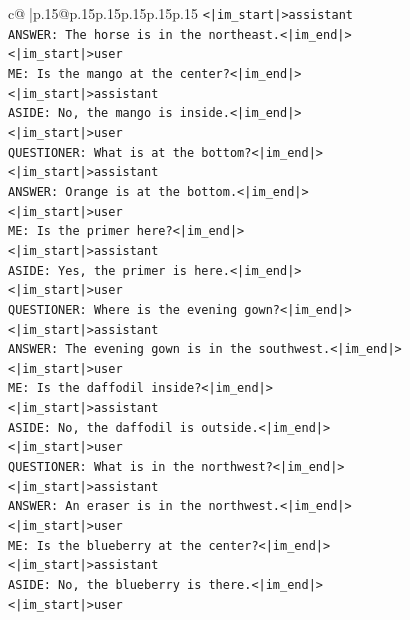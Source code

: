 \documentclass{article}
\begin{document}
{\begin{supertabular}{c@{$\;$}|p{.15\linewidth}@{}p{.15\linewidth}p{.15\linewidth}p{.15\linewidth}p{.15\linewidth}p{.15\linewidth}}
{{{\texttt{<|im\_start|>assistant} \\
\texttt{ANSWER: The horse is in the northeast.<|im\_end|>} \\
\texttt{<|im\_start|>user} \\
\texttt{ME: Is the mango at the center?<|im\_end|>} \\
\texttt{<|im\_start|>assistant} \\
\texttt{ASIDE: No, the mango is inside.<|im\_end|>} \\
\texttt{<|im\_start|>user} \\
\texttt{QUESTIONER: What is at the bottom?<|im\_end|>} \\
\texttt{<|im\_start|>assistant} \\
\texttt{ANSWER: Orange is at the bottom.<|im\_end|>} \\
\texttt{<|im\_start|>user} \\
\texttt{ME: Is the primer here?<|im\_end|>} \\
\texttt{<|im\_start|>assistant} \\
\texttt{ASIDE: Yes, the primer is here.<|im\_end|>} \\
\texttt{<|im\_start|>user} \\
\texttt{QUESTIONER: Where is the evening gown?<|im\_end|>} \\
\texttt{<|im\_start|>assistant} \\
\texttt{ANSWER: The evening gown is in the southwest.<|im\_end|>} \\
\texttt{<|im\_start|>user} \\
\texttt{ME: Is the daffodil inside?<|im\_end|>} \\
\texttt{<|im\_start|>assistant} \\
\texttt{ASIDE: No, the daffodil is outside.<|im\_end|>} \\
\texttt{<|im\_start|>user} \\
\texttt{QUESTIONER: What is in the northwest?<|im\_end|>} \\
\texttt{<|im\_start|>assistant} \\
\texttt{ANSWER: An eraser is in the northwest.<|im\_end|>} \\
\texttt{<|im\_start|>user} \\
\texttt{ME: Is the blueberry at the center?<|im\_end|>} \\
\texttt{<|im\_start|>assistant} \\
\texttt{ASIDE: No, the blueberry is there.<|im\_end|>} \\
\texttt{<|im\_start|>user} \\
}}}
\end{supertabular}}
\end{document}

